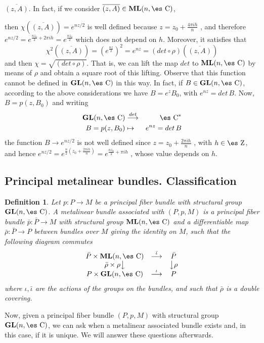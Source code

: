 \documentclass[12pt]{article}
\theoremstyle{plain}
\newtheorem{definition}{Definition}
\def\beann{\begin{eqnarray*}}
\def\eeann{\end{eqnarray*}}
\def\dst{\(}
\def\mapping#1{\mathrel{\mathop{\longrightarrow}\limits^{#1}}}
\def\GL{{\bf GL}(n,\Complex )}
\def\ML{{\bf ML}(n,\Complex )}
\def\Zahl{\mbox{\es Z}}
\def\Complex{\mbox{\es C}}
\begin{document}
$\overline{(z,A)}$.  In fact, if we consider $\overline{(z,A)} \in \ML$,

then $\chi(\overline{(z,A)}) = e^{nz/2}$ is well defined because
\dst z=z_0+\frac{4\pi i h}{n}\) , and therefore
\dst e^{nz/2}=e^{\frac{nz_0}{2}+2\pi i h}=e^{\frac{nz_0}{2}}\)
which does not depend on $h$. Moreover, it satisfies that
$$
\chi^2(\overline{(z,A)}) = (e^{\frac{nz}{2}})^2 = e^{nz} = (det \circ
\rho )(\overline{(z,A)})
$$
and then $\chi = \sqrt{(det \circ \rho )}$.
That is, we can lift the map $det$ to $\ML$ by means of $\rho$ and
obtain a square root of this lifting. Observe that this function cannot
be defined
in $\GL$ in this way. In fact, if $B \in \GL$, according to the above
considerations we have
$B=e^{z} B_0$, with $e^{nz}=det\, B$. Now, $B=p(z,B_0)$ and writing
\beann
\GL &\mapping{det}& \Complex^*
\\
B=p(z,B_0) &\mapsto& e^{nz}=det\, B
\eeann
the function $B \to e^{nz/2}$ is not well defined since
\dst z=z_0+\frac{2\pi i h}{n}\) , with $h\in \Zahl$, and hence
\dst e^{nz/2} =e^{\frac{n}{2}(z_0+\frac{2\pi i h}{n})} =
e^{\frac{nz_0}{2}+\pi i h}\) ,
whose value depends on $h$.



\subsection{Principal metalinear bundles. Classification}


\begin{definition}
Let $p : P \to M$ be a principal fiber bundle with structural group
$\GL$.
A {\rm metalinear bundle associated with} $(P,p,M)$
is a principal fiber bundle $\bar p : \bar P \to M$
 with structural group $\ML$ and a differentiable map
 $\bar \rho : \bar P\to P$
between bundles over $M$ giving the identity on $M$,
such that the following diagram commutes
$$
\begin{array}{ccc}
\bar P \times \ML & \mapping{\bar \iota} & \bar P
\\
\bar \rho \times \rho \big\downarrow & & \big\downarrow \rho
\\
P \times \GL & \mapping{\iota} & P
\end{array}
$$
where $\iota , \bar \iota$ are the actions of the groups on the bundles,
and such that $\bar \rho$ is a double covering.
\label{amfb}
\end{definition}
\noindent Now, given a principal fiber bundle $(P,p,M)$ with structural group
$\GL$,
we can ask when a metalinear associated bundle exists and,
in this case, if it is unique. We will answer these questions
afterwards.
\end{document}
